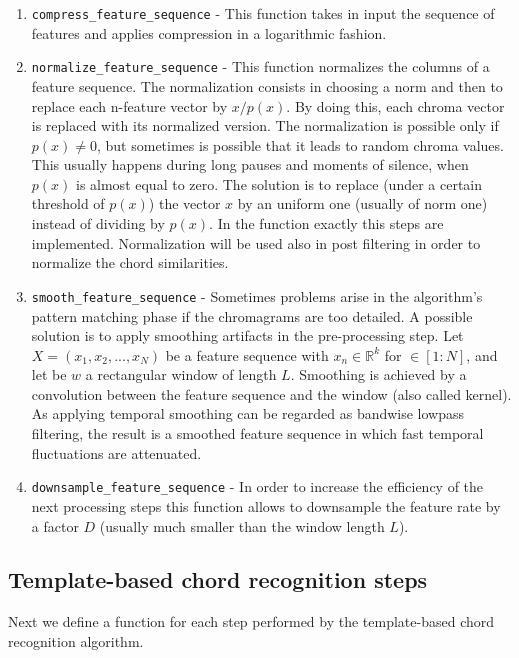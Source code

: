 \documentclass[
	12pt, %
]{fphw}
\begin{document}
\begin{enumerate}
	\item \verb|compress_feature_sequence| - This function takes in input the sequence of features and applies compression in a logarithmic fashion.
	\item \verb|normalize_feature_sequence| - This function normalizes the columns of a feature sequence. The  normalization consists in choosing a norm and then to replace each n-feature vector  by $x/p(x)$. By doing this, each chroma vector is replaced with its normalized version.  The normalization is possible only if $p(x)\neq0$, but sometimes is possible that it leads to random chroma values. This usually happens during long pauses and moments of silence, when $p(x)$ is almost equal to zero. The solution is to replace (under a certain threshold of $p(x)$) the vector $x$  by an uniform one (usually of norm one) instead of dividing by $p(x)$. In the function exactly this steps are implemented. Normalization will be used also in post filtering in order to normalize the chord similarities.
	\item \verb|smooth_feature_sequence| - Sometimes problems arise in the algorithm's pattern matching phase if the chromagrams are too detailed. A possible solution is to apply smoothing artifacts in the pre-processing step. Let \(X=(x_1,x_2,...,x_N)\) be a feature sequence with $x_n \in \mathbb{R}^k$ for $\in[1:N]$, and let be $w$ a rectangular window of length $L$. Smoothing is achieved by a convolution between the feature sequence and the window (also called kernel). As applying temporal smoothing can be regarded as bandwise lowpass filtering, the result is a smoothed feature sequence in which fast temporal fluctuations are attenuated.
	\item \verb|downsample_feature_sequence| - In order to increase the efficiency of the next processing steps this function allows to downsample the feature rate by a factor $D$ (usually much smaller than the window length $L$).
\end{enumerate}

\subsection*{Template-based chord recognition steps}

Next we define a function for each step performed by the template-based chord recognition algorithm.
\end{document}
